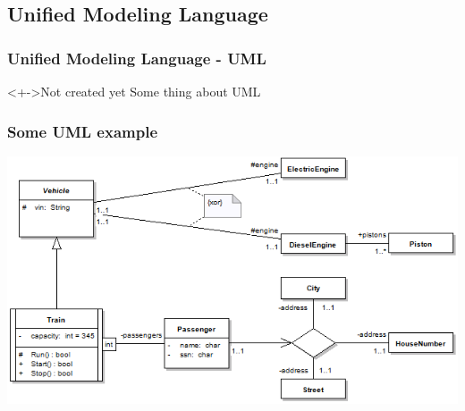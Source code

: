\subsection{Unified Modeling Language}
%
%
\frame
{
  \frametitle{Unified Modeling Language - UML}

\begin{center}

	\begin{block}<+->{Not created yet}
	Some thing about UML
	\end{block}

\end{center}
}


%
%
\frame
{
  \frametitle{Some UML example}

\begin{center}

\includegraphics[width=\textwidth]{images/ClassDiagramOverview.png}

\end{center}
}

